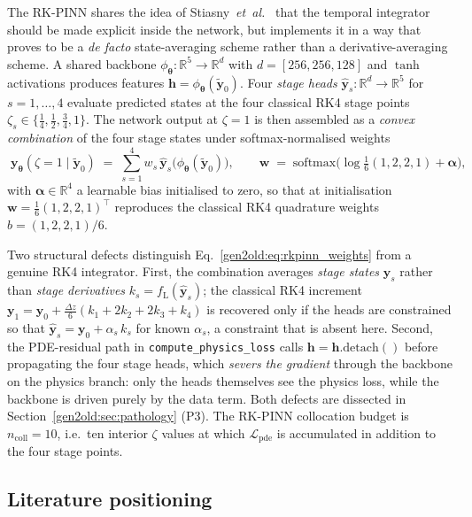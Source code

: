 \documentclass[a4paper,11pt]{article}
\newcommand{\dz}{\Delta z}
\newcommand{\state}{\mathbf{y}}
\newcommand{\loss}{\mathcal{L}}
\newcommand{\btheta}{\bm{\theta}}
\begin{document}
The RK-PINN shares the idea of Stiasny~\textit{et~al.}~\cite{stiasny2021}
that the temporal integrator should be made explicit inside the network, but
implements it in a way that proves to be a \emph{de facto} state-averaging
scheme rather than a derivative-averaging scheme. A shared backbone
$\phi_{\btheta}:\mathbb{R}^5\to\mathbb{R}^d$ with
$d\!=\![256,256,128]$ and $\tanh$ activations produces features
$\mathbf{h}=\phi_{\btheta}(\tilde{\state}_0)$. Four \emph{stage heads}
$\hat{\state}_s:\mathbb{R}^d\to\mathbb{R}^5$ for $s=1,\ldots,4$ evaluate
predicted states at the four classical RK4 stage points
$\zeta_s\in\{\tfrac14,\tfrac12,\tfrac34,1\}$. The network output at
$\zeta=1$ is then assembled as a \emph{convex combination} of the four stage
states under softmax-normalised weights
\begin{equation}\label{gen2old:eq:rkpinn_weights}
  \boxed{\;
    \state_{\btheta}(\zeta{=}1\mid\tilde{\state}_0)
    \;=\;
    \sum_{s=1}^{4} w_s\,\hat{\state}_s\!\bigl(\phi_{\btheta}(\tilde{\state}_0)\bigr),
    \qquad
    \mathbf{w}
    \;=\;
    \mathrm{softmax}\!\bigl(\log\tfrac{1}{6}(1,2,2,1) + \bm{\alpha}\bigr),
  \;}
\end{equation}
with $\bm{\alpha}\in\mathbb{R}^4$ a learnable bias initialised to zero, so
that at initialisation $\mathbf{w}=\tfrac{1}{6}(1,2,2,1)^\top$ reproduces the
classical RK4 quadrature weights $b=(1,2,2,1)/6$.

Two structural defects distinguish Eq.~\ref{gen2old:eq:rkpinn_weights} from
a genuine RK4 integrator. First, the combination averages \emph{stage states}
$\hat{\state}_s$ rather than \emph{stage derivatives}
$k_s=f_{\mathrm{L}}(\hat{\state}_s)$; the classical RK4 increment
$\state_1=\state_0+\tfrac{\dz}{6}(k_1+2k_2+2k_3+k_4)$ is recovered only if the
heads are constrained so that $\hat{\state}_s=\state_0+\alpha_s\,k_s$ for
known $\alpha_s$, a constraint that is absent here. Second, the PDE-residual
path in \texttt{compute\_physics\_loss} calls
$\mathbf{h}=\mathbf{h}.\mathrm{detach}()$ before propagating the four stage
heads, which \emph{severs the gradient} through the backbone on the physics
branch: only the heads themselves see the physics loss, while the backbone
is driven purely by the data term. Both defects are dissected in
Section~\ref{gen2old:sec:pathology} (P3). The RK-PINN collocation budget is
$n_{\mathrm{coll}}=10$, i.e.\ ten interior $\zeta$ values at which
$\loss_{\mathrm{pde}}$ is accumulated in addition to the four stage points.

\subsection{Literature positioning}\label{gen2old:sub:literature}
\end{document}
